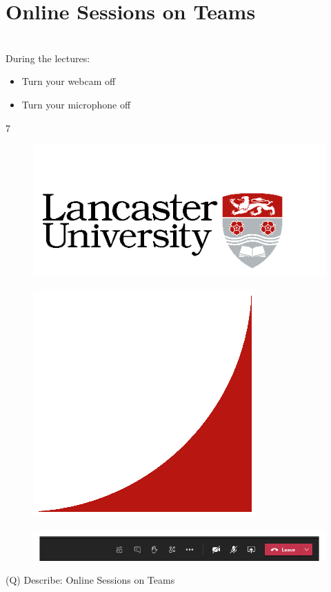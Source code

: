 \documentclass[12pt]{article}
\begin{document}
\section{Online Sessions on Teams}
\\
During the lectures:\\
\begin{itemize}
  \item Turn your webcam off
  \item Turn your microphone off
\end{itemize}
7\\
\begin{figure}[H]
\includegraphics[width=0.5\linewidth]{page7-image-1.png}
\end{figure}
\begin{figure}[H]
\includegraphics[width=0.5\linewidth]{page7-image-2.png}
\end{figure}
\begin{figure}[H]
\includegraphics[width=0.5\linewidth]{page7-image-3.png}
\end{figure}
\clearpage
(Q)
Describe: Online Sessions on Teams
\clearpage
\end{document}
